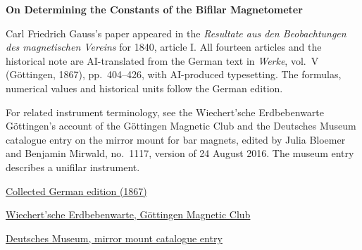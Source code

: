 \clearpage
\thispagestyle{empty}
\begin{center}\Large\textbf{On Determining the Constants of the Bifilar Magnetometer}\end{center}

Carl Friedrich Gauss’s paper appeared in the \textit{Resultate aus den Beobachtungen des magnetischen Vereins} for 1840, article I. All fourteen articles and the historical note are AI-translated from the German text in \textit{Werke}, vol.~V (Göttingen, 1867), pp.~404--426, with AI-produced typesetting. The formulas, numerical values and historical units follow the German edition.

\medskip\noindent
For related instrument terminology, see the Wiechert’sche Erdbebenwarte Göttingen’s account of the Göttingen Magnetic Club and the Deutsches Museum catalogue entry on the mirror mount for bar magnets, edited by Julia Bloemer and Benjamin Mirwald, no.~1117, version of 24 August 2016. The museum entry describes a unifilar instrument.

\medskip\noindent
\href{https://gdz.sub.uni-goettingen.de/id/PPN236006339}{Collected German edition (1867)}\par
\noindent\href{https://www.erdbebenwarte.de/en/goettinger-magnetischer-verein/}{Wiechert’sche Erdbebenwarte, Göttingen Magnetic Club}\par
\noindent\href{https://digital.deutsches-museum.de/projekte/gruendungssammlung/detail/1117/}{Deutsches Museum, mirror mount catalogue entry}
\clearpage
